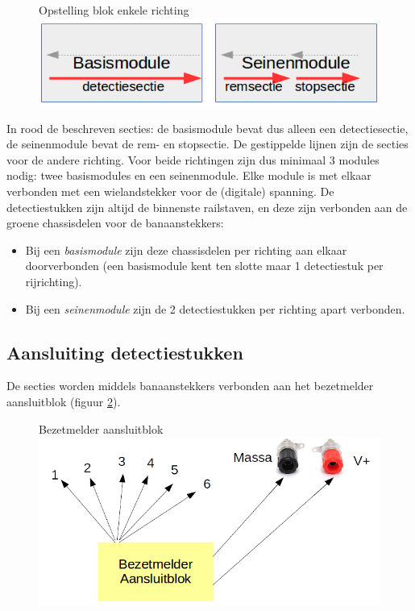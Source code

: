 \documentclass[12pt,a4paper]{report}
\begin{document}
\begin{figure}[!ht]
  \captionbox
  {Opstelling blok enkele richting\label{im:3secties}}
  {\includegraphics[scale=1.0]{images/rcu_3_secties}}
\end{figure}

In rood de beschreven secties: de basismodule bevat dus alleen een detectiesectie, de seinenmodule bevat de rem- en stopsectie. De gestippelde lijnen zijn de secties voor de andere richting.
Voor beide richtingen zijn dus minimaal 3 modules nodig: twee basismodules en een seinenmodule.
Elke module is met elkaar verbonden met een wielandstekker voor de (digitale) spanning. De detectiestukken zijn altijd de binnenste railstaven, en deze zijn verbonden aan de groene chassisdelen voor de banaanstekkers:
\begin{itemize}
\item Bij een \emph{basismodule} zijn deze chassisdelen per richting aan elkaar doorverbonden (een basismodule kent ten slotte maar 1 detectiestuk per rijrichting).
\item Bij een \emph{seinenmodule} zijn de 2 detectiestukken per richting apart verbonden.
\end{itemize}

\subsection{Aansluiting detectiestukken}
De secties worden middels banaanstekkers verbonden aan het bezetmelder aansluitblok (figuur \ref{im:rcu_bezetmelderblok}). 

\begin{figure}[h]
  \captionbox
  {Bezetmelder aansluitblok\label{im:rcu_bezetmelderblok}}
  {\includegraphics[scale=1.0]{images/rcu_bezetmelderblok}}
\end{figure}
\end{document}
